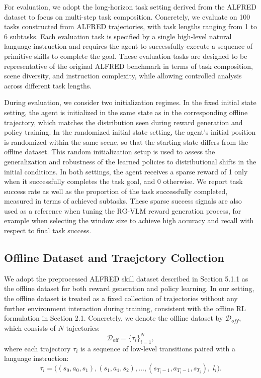\documentclass[master,english,final]{kaist-ucs}
\begin{document}
For evaluation, we adopt the long-horizon task setting derived from the ALFRED dataset to focus on multi-step task composition. Concretely, we evaluate on 100 tasks constructed from ALFRED trajectories, with task lengths ranging from 1 to 6 subtasks. Each evaluation task is specified by a single high-level natural language instruction and requires the agent to successfully execute a sequence of primitive skills to complete the goal. These evaluation tasks are designed to be representative of the original ALFRED benchmark in terms of task composition, scene diversity, and instruction complexity, while allowing controlled analysis across different task lengths.

During evaluation, we consider two initialization regimes. In the fixed initial state setting, the agent is initialized in the same state as in the corresponding offline trajectory, which matches the distribution seen during reward generation and policy training. In the randomized initial state setting, the agent’s initial position is randomized within the same scene, so that the starting state differs from the offline dataset. This random initialization setup is used to assess the generalization and robustness of the learned policies to distributional shifts in the initial conditions. In both settings, the agent receives a sparse reward of 1 only when it successfully completes the task goal, and 0 otherwise. We report task success rate as well as the proportion of the task successfully completed, measured in terms of achieved subtasks. These sparse success signals are also used as a reference when tuning the RG-VLM reward generation process, for example when selecting the window size to achieve high accuracy and recall with respect to final task success.

\subsection{Offline Dataset and Traejctory Collection}
We adopt the preprocessed ALFRED skill dataset described in Section 5.1.1 as the offline dataset for both reward generation and policy learning. In our setting, the offline dataset is treated as a fixed collection of trajectories without any further environment interaction during training, consistent with the offline RL formulation in Section 2.1. Concretely, we denote the offline dataset by $\mathcal{D}_{off}$, which consists of $N$ tajectories:
\begin{equation}
    \mathcal{D}_{\text{off}} = \{\tau_i\}_{i=1}^N,
\end{equation}
where each trajectory $\tau_i$ is a sequence of low-level transitions paired with a language instruction:
\begin{equation}
    \tau_i = \bigl( (s_0, a_0, s_1), (s_1, a_1, s_2), \dots, (s_{T_i-1}, a_{T_i-1}, s_{T_i}), \; l_i \bigr).
\end{equation}
\end{document}

